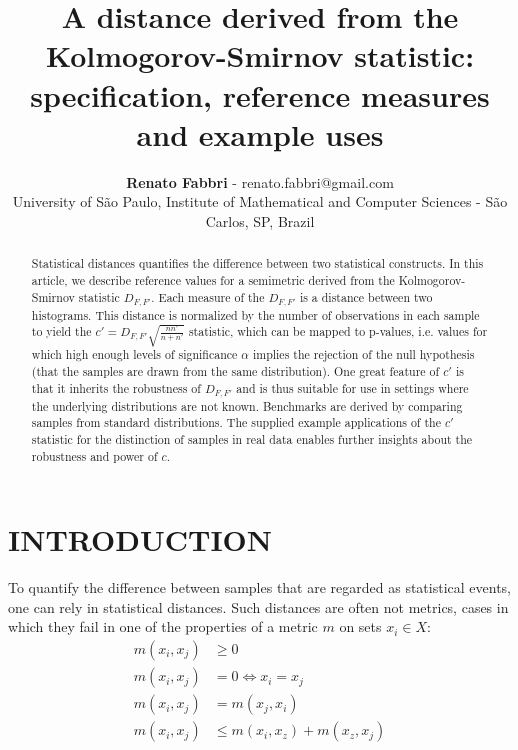 \documentclass[12pt,fleqn]{article}
\title{A distance derived from the Kolmogorov-Smirnov statistic:
	specification, reference measures and example uses}
\author
    {\rm \begin{tabular}{l} 
    \textbf{Renato Fabbri}$$ - {\textnormal renato.fabbri@gmail.com}\\%
    {\fontsize{11}{0}\selectfont University of São Paulo, Institute of Mathematical and Computer Sciences - São Carlos, SP, Brazil}\vspace*{-0.05cm} \\
  \end{tabular}}
\renewcommand{\headrulewidth}{0.0pt}
\begin{document}
\maketitle

\thispagestyle{firspagetstyle}

\renewcommand{\headrulewidth}{0.0pt}
\rhead{}

\begin{abstract}
Statistical distances quantifies the difference between two statistical constructs.
In this article, we describe reference values for a semimetric
derived from the Kolmogorov-Smirnov statistic $D_{F,F'}$.
Each measure of the $D_{F,F'}$ is a distance between two histograms.
This distance is normalized by the number of observations in each sample
to yield the $c'=D_{F,F'}\sqrt{\frac{n n'}{n+n'}}$ statistic,
which can be mapped to p-values, i.e. values for which 
high enough levels of significance $\alpha$ implies the rejection of the
	null hypothesis (that the samples are drawn from the same distribution).
One great feature of $c'$ is that it inherits the robustness of
	$D_{F,F'}$ and is thus suitable for use in settings where
	the underlying distributions are not known.
Benchmarks are derived by comparing samples from standard distributions.
The supplied example applications of the $c'$ statistic for the distinction
	of samples in real data enables further
insights about the robustness and power of $c$.
\end{abstract}


\pagestyle{fancy}

\section{INTRODUCTION}\label{sec:intro}
To quantify the difference between samples that are regarded as statistical events,
one can rely in statistical distances.
Such distances are often not metrics, cases in which they fail in one of
the properties of a metric $m$ on sets $x_i \in X$:
\begin{align}
	m(x_i,x_j) &  \geq 0 \\
	m(x_i,x_j) &  = 0 \Leftrightarrow x_i = x_j \\
	m(x_i,x_j) &  = m(x_j,x_i)\\
	m(x_i,x_j) &  \leq m(x_i,x_z) + m(x_z,x_j)
\end{align}
\end{document}
